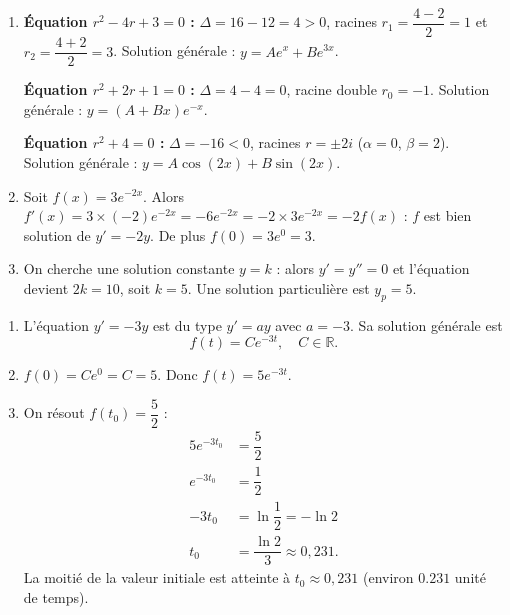 \documentclass[11pt]{article}
\begin{document}
\begin{corrige}
\begin{enumerate}
\item \textbf{Équation $r^2 - 4r + 3 = 0$ :} $\Delta = 16 - 12 = 4 > 0$, racines $r_1 = \dfrac{4 - 2}{2} = 1$ et $r_2 = \dfrac{4 + 2}{2} = 3$. Solution générale : $y = Ae^{x} + Be^{3x}$.

\textbf{Équation $r^2 + 2r + 1 = 0$ :} $\Delta = 4 - 4 = 0$, racine double $r_0 = -1$. Solution générale : $y = (A + Bx)e^{-x}$.

\textbf{Équation $r^2 + 4 = 0$ :} $\Delta = -16 < 0$, racines $r = \pm 2i$ ($\alpha = 0$, $\beta = 2$). Solution générale : $y = A\cos(2x) + B\sin(2x)$.
\item Soit $f(x) = 3e^{-2x}$. Alors $f'(x) = 3 \times (-2)e^{-2x} = -6e^{-2x} = -2 \times 3e^{-2x} = -2f(x)$ : $f$ est bien solution de $y' = -2y$. De plus $f(0) = 3e^{0} = 3$.
\item On cherche une solution constante $y = k$ : alors $y' = y'' = 0$ et l'équation devient $2k = 10$, soit $k = 5$. Une solution particulière est $y_p = 5$.
\end{enumerate}
\end{corrige}

\begin{corrige}
\begin{enumerate}
\item L'équation $y' = -3y$ est du type $y' = ay$ avec $a = -3$. Sa solution générale est
\[ f(t) = Ce^{-3t}, \quad C \in \mathbb{R}. \]
\item $f(0) = Ce^{0} = C = 5$. Donc $f(t) = 5e^{-3t}$.
\item On résout $f(t_0) = \dfrac{5}{2}$ :
\begin{align*}
5e^{-3t_0} &= \dfrac{5}{2} \\
e^{-3t_0} &= \dfrac{1}{2} \\
-3t_0 &= \ln\dfrac{1}{2} = -\ln 2 \\
t_0 &= \dfrac{\ln 2}{3} \approx 0{,}231.
\end{align*}
La moitié de la valeur initiale est atteinte à $t_0 \approx 0{,}231$ (environ $\num{0,231}$ unité de temps).
\end{enumerate}
\end{corrige}
\end{document}
